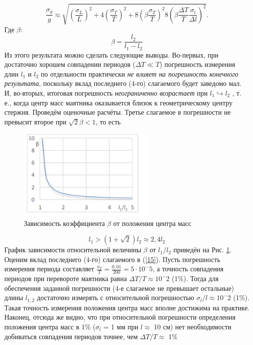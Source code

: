 \documentclass[a4paper, 12pt]{article}
\begin{document}
\begin{equation}
    \label{15}
    \frac{\sigma_g}{g} \approx \sqrt{(\frac{\sigma_L}{L})^2 + 4(\frac{\sigma_T}{T})^2 + 8(\beta\frac{\sigma_T}{T})^2 8(\beta\frac{\Delta{T}}{T}\frac{\sigma_l}{\Delta{l}})^2} .
\end{equation}
Где $\beta$: \newline
\begin{equation*}
    \beta = \frac{l_2}{l_1 - l_2}
\end{equation*}
Из этого результата можно сделать следующие выводы. Во-первых, при достаточно хорошем совпадении периодов ($\Delta{T} \ll T$) погрешность измерения длин $l_1$ и $l_2$ по отдельности практически \textit{не влияет на погрешность конечного результата}, поскольку вклад последнего (4-го) слагаемого будет заведомо мал. И, во-вторых, итоговая погрешность \textit{неограниченно возрастает} при $l_1 \hookrightarrow l_2$ , т. е., когда центр масс маятника оказывается близок к геометрическому центру стержня. Проведём оценочные расчёты. Третье слагаемое в погрешности не превысит второе при $\sqrt{2}\beta < 1$, то есть \newline
\begin{figure}[h!]
		\begin{center}
			\includegraphics[width = 0.6\textwidth]{4.png}
			\caption{Зависимость коэффициента $\beta$ от положения центра масс}
			\label{grafic}
		\end{center}
	\end{figure}
\begin{equation*}
\label{uslovie}
    l_1 > (1 + \sqrt{2})l_2 \approx 2,4l_2
\end{equation*}
График зависимости относительной величины $\beta$ от $l_1/l_2$ приведён на Рис. \ref{grafic}.\newline
Оценим вклад последнего (4-го) слагаемого в (\ref{15}). Пусть погрешность измерения периода составляет $\frac{\sigma_T}{T} = \frac{0,01}{200} = 5\cdot10^-5$, а точность совпадения периодов при перевороте маятника равна $\Delta{T}/T \approx 10^-2 $ (1\%). Тогда для обеспечения заданной погрешности (4-е слагаемое не превышает остальные) длины $l_{1,2}$ достаточно измерять с относительной погрешностью $\sigma_l / l \approx 10^-2$ (1\%). Такая точность измерения положения центра масс вполне достижима на практике. Наконец, отсюда же видно, что при относительной погрешности определения положения центра масс в 1\% ($\sigma_l$ = 1 мм при $l \approx$ 10 см) нет необходимости добиваться совпадения периодов точнее, чем $\Delta{T}/T \approx$ 1\%
\end{document}
